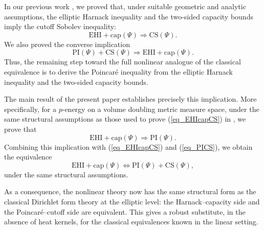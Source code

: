 \documentclass[11pt,a4paper]{article}
\numberwithin{equation}{section}
\theoremstyle{plain}
\theoremstyle{definition}
\begin{document}
In our previous work \cite{Yan25d}, we proved that, under suitable geometric and analytic assumptions, the elliptic Harnack inequality and the two-sided capacity bounds imply the cutoff Sobolev inequality:
\begin{equation}\label{eq_EHIcapCS}
\text{EHI}+\text{cap}(\Psi)\Rightarrow\text{CS}(\Psi).
\end{equation}
We also proved the converse implication
\begin{equation}\label{eq_PICS}
\text{PI}(\Psi)+\text{CS}(\Psi)\Rightarrow\text{EHI}+\text{cap}(\Psi).
\end{equation}
Thus, the remaining step toward the full nonlinear analogue of the classical equivalence is to derive the Poincar\'e inequality from the elliptic Harnack inequality and the two-sided capacity bounds.

The main result of the present paper establishes precisely this implication. More specifically, for a $p$-energy on a volume doubling metric measure space, under the same structural assumptions as those used to prove (\ref{eq_EHIcapCS}) in \cite{Yan25d}, we prove that
$$\text{EHI}+\text{cap}(\Psi)\Rightarrow \text{PI}(\Psi).$$
Combining this implication with (\ref{eq_EHIcapCS}) and (\ref{eq_PICS}), we obtain the equivalence
\begin{equation}\label{eq_equiv}
\text{EHI}+\text{cap}(\Psi)\Leftrightarrow\text{PI}(\Psi)+\text{CS}(\Psi),
\end{equation}
under the same structural assumptions.

As a consequence, the nonlinear theory now has the same structural form as the classical Dirichlet form theory at the elliptic level: the Harnack--capacity side and the Poincar\'e--cutoff side are equivalent. This gives a robust substitute, in the absence of heat kernels, for the classical equivalences known in the linear setting.
\end{document}
